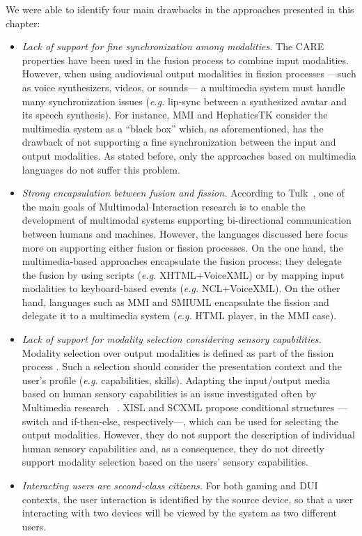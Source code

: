 We were able to identify four main drawbacks in the approaches presented in this chapter:

\begin{itemize}
	\item \textit{Lack of support for fine synchronization among modalities.} The
	CARE properties have been used in the fusion process to combine input
	modalities. However, when using audiovisual output modalities in fission
	processes —such as voice synthesizers, videos, or sounds— a multimedia system
	must handle many synchronization issues (\textit{e.g.} lip-sync between a synthesized
	avatar and its speech synthesis). For instance, MMI and HephaticsTK consider
	the multimedia system as a “black box” which, as aforementioned, has the
	drawback of not supporting a fine synchronization between the input and output
	modalities. As stated before, only the approaches based on multimedia
	languages do not suffer this problem.

	\item\textit{Strong encapsulation between fusion and fission.} According to
	Tulk~\cite{turk_multimodal_2014}, one of the main goals of Multimodal
	Interaction research is to enable the development of multimodal systems
	supporting bi-directional communication between humans and machines. However,
	the languages discussed here focus more on supporting either fusion or fission
	processes. On the one hand, the multimedia-based approaches encapsulate the
	fusion process; they delegate the fusion by using scripts (\textit{e.g.} XHTML+VoiceXML)
	or by mapping input modalities to keyboard-based events (\textit{e.g.} NCL+VoiceXML). On
	the other hand, languages such as MMI and SMIUML encapsulate the fission and
	delegate it to a multimedia system (\textit{e.g.} HTML player, in the MMI case).

	\item \textit{Lack of support for modality selection considering sensory
	capabilities.} Modality selection over output modalities is defined as part of
	the fission process \cite{costa_adapting_2011,dumas_multimodal_2009}.
	Such a selection should consider the
	presentation context and the user’s profile (\textit{e.g.} capabilities,
	skills).
	Adapting the input/output media based on human sensory capabilities is an
	issue investigated often by Multimedia research
	~\cite{ghinea_mulsemedia:_2014}. XISL and SCXML propose conditional structures
	—switch and if-then-else, respectively—, which can be used for selecting the
	output modalities. However, they do not support the description of individual
	human sensory capabilities and, as a consequence, they do not directly support
	modality selection based on the users’ sensory capabilities.

	\item \textit{Interacting users are second-class citizens.} For both gaming
	and DUI contexts, the user interaction is identified by the source device, so
	that a user interacting with two devices will be viewed by the system as two
	different users.
\end{itemize}

